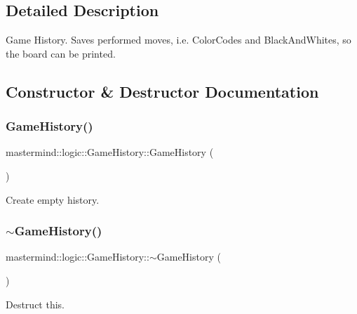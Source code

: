 \subsection{Detailed Description}
Game History. Saves performed moves, i.\+e. Color\+Codes and Black\+And\+Whites, so the board can be printed. 

\subsection{Constructor \& Destructor Documentation}
\hypertarget{classmastermind_1_1logic_1_1_game_history_a4731c4c94790c94c5f5e72a5ef344602}{}\label{classmastermind_1_1logic_1_1_game_history_a4731c4c94790c94c5f5e72a5ef344602} 
\subsubsection{\texorpdfstring{Game\+History()}{GameHistory()}}
{\footnotesize\ttfamily mastermind\+::logic\+::\+Game\+History\+::\+Game\+History (\begin{DoxyParamCaption}{ }\end{DoxyParamCaption})}



Create empty history. 

\hypertarget{classmastermind_1_1logic_1_1_game_history_a7f94763f41492e795201f000874ba9e1}{}\label{classmastermind_1_1logic_1_1_game_history_a7f94763f41492e795201f000874ba9e1} 
\subsubsection{\texorpdfstring{$\sim$\+Game\+History()}{~GameHistory()}}
{\footnotesize\ttfamily mastermind\+::logic\+::\+Game\+History\+::$\sim$\+Game\+History (\begin{DoxyParamCaption}{ }\end{DoxyParamCaption})}



Destruct this. 



